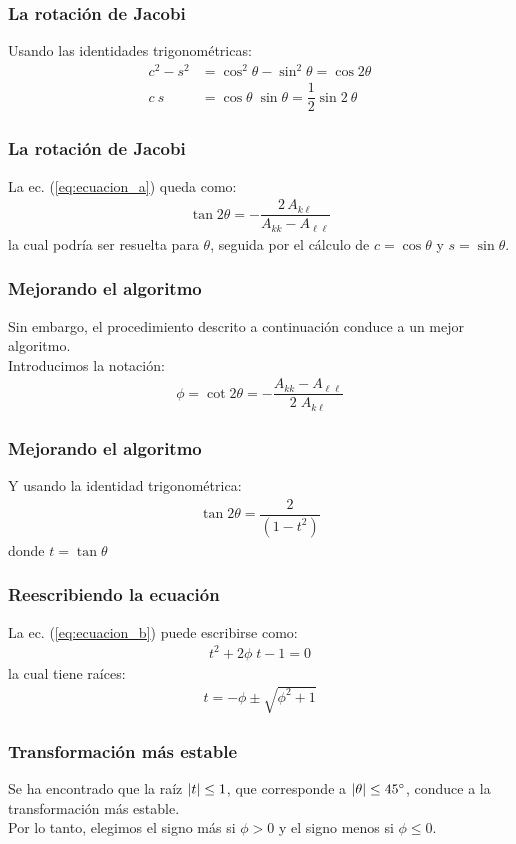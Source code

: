 \documentclass[12pt]{beamer}
\begin{document}
\begin{frame}
\frametitle{La rotación de Jacobi}
Usando las identidades trigonométricas:
\pause
\begin{align*}
c^{2} - s^{2} &= \cos^{2} \theta - \sin^{2} \theta = \cos 2 \theta \\
c \: s &= \cos \theta \; \sin \theta = \dfrac{1}{2} \sin 2 \: \theta
\end{align*}
\end{frame}
\begin{frame}
\frametitle{La rotación de Jacobi}
La ec. (\ref{eq:ecuacion_a}) queda como:
\pause
\begin{align}
\tan 2 \theta = - \dfrac{2 \, A_{k \ell}}{A_{k k} - A_{\ell \ell}}
\label{eq:ecuacion_b}
\end{align}
la cual podría ser resuelta para $\theta$, seguida por el cálculo de $c = \cos \theta$ y $s = \sin \theta$.
\end{frame}
\begin{frame}
\frametitle{Mejorando el algoritmo}
Sin embargo, el procedimiento descrito a continuación conduce a un mejor algoritmo.
\\
\bigskip
\pause
Introducimos la notación:
\pause
\begin{align}
\phi = \cot 2 \theta = - \dfrac{A_{k k} - A_{\ell \ell}}{2 \; A_{k \ell}}
\label{eq:ecuacion_09_15}
\end{align}
\end{frame}
\begin{frame}
\frametitle{Mejorando el algoritmo}
Y usando la identidad trigonométrica:
\pause
\begin{align*}
\tan 2 \theta = \dfrac{2}{(1 - t^{2})}
\end{align*}
donde $t = \tan \theta$
\end{frame}
\begin{frame}
\frametitle{Reescribiendo la ecuación}
La ec. (\ref{eq:ecuacion_b}) puede escribirse como:
\pause
\begin{align*}
t^{2} +  2 \phi \; t - 1 = 0
\end{align*}
\pause
la cual tiene raíces:
\pause
\begin{align*}
t =  - \phi \pm \sqrt{\phi^{2} + 1}
\end{align*}
\end{frame}
\begin{frame}
\frametitle{Transformación más estable}
Se ha encontrado que la raíz $\abs{t} \leq 1$, que corresponde a $\abs{\theta} \leq \ang{45}$, conduce a la transformación más estable.
\\
\bigskip
\pause
Por lo tanto, elegimos el signo más si $\phi > 0$  y el signo menos si $\phi \leq 0$.
\end{frame}
\end{document}
